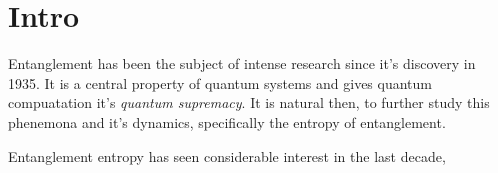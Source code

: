 \section{Intro}



Entanglement has been the subject of intense research since it's discovery in 1935. It is a central property of quantum systems and gives quantum compuatation
it's \textit{quantum supremacy}. It is natural then, to further study this phenemona and it's dynamics, specifically the entropy of entanglement. 

Entanglement entropy has seen considerable interest in the last decade, \cite{ShenkerBlackHolesButterfly2014}